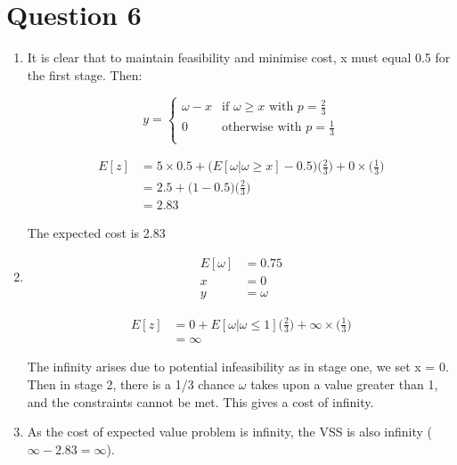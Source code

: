\documentclass[10pt,a4paper]{article}
\begin{document}
\section*{Question 6}
\begin{enumerate}
\item
It is clear that to maintain feasibility and minimise cost, x must equal 0.5 for the first stage. Then:

\begin{equation*}
	y = 
		\begin{cases}
			\omega - x & \text{if } \omega \geq x \text{  with }  p=\frac{2}{3} \\
			0 & \text{otherwise} \text{  with } p=\frac{1}{3} \\
		\end{cases}
\end{equation*}

\begin{align*}
	E[z] &= 5 \times 0.5 + \bigg(E[\omega | \omega \geq x] - 0.5\bigg)\bigg(\frac{2}{3}\bigg) + 0 \times\bigg(\frac{1}{3}\bigg)\\
	&= 2.5 + \bigg(1-0.5\bigg)\bigg(\frac{2}{3}\bigg)\\
	&= 2.83
\end{align*}

The expected cost is 2.83 \\

\item 
\begin{align*}
	E[\omega] &= 0.75 \\
	x &= 0 \\
	y &= \omega
\end{align*}

\begin{align*}
E[z] &= 0 + E[\omega | \omega \leq 1]\bigg(\frac{2}{3}\bigg) + \infty \times\bigg(\frac{1}{3}\bigg)\\
&= \infty
\end{align*}

The infinity arises due to potential infeasibility as in stage one, we set x = 0. Then in stage 2, there is a 1/3 chance \(\omega\) takes upon a value greater than 1, and the constraints cannot be met. This gives a cost of infinity.

\item 
As the cost of expected value problem is infinity, the VSS is also infinity (\(\infty - 2.83 = \infty\)).

\end{enumerate}
\end{document}
